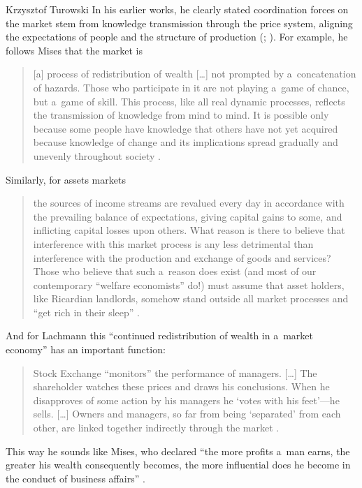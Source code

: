\begin{artengenv}{Krzysztof Turowski}
In his earlier works, he clearly stated coordination forces on the market stem from knowledge
transmission through the price system, aligning the expectations of people and the structure of production (\cite[103]{lachmann-ha}; \citeyear[62]{lachmann1956capital}).
For example, he follows Mises that the market is
\begin{quote}
[a] process of redistribution of wealth [\ldots] not prompted by a~concatenation of hazards. Those who participate in it are not playing a~game of chance, but a~game of skill. This process, like all real dynamic processes, reflects the transmission of knowledge from mind to mind. It is possible only because some people have knowledge that others have not yet acquired because knowledge of change and its implications spread gradually and unevenly throughout society \parencite[313]{lachmann-market-distribution}.
\end{quote}
Similarly, for assets markets
\begin{quote}
the sources of income streams are revalued every day in accordance with the prevailing balance of expectations, giving capital gains to some, and inflicting capital losses upon others. What reason is there to believe that interference with this market process is any less detrimental than interference with the production and exchange of goods and services? Those who believe that such a~reason does exist (and most of our contemporary ``welfare economists'' do!) must assume that asset holders, like Ricardian landlords, somehow stand outside all market processes and ``get rich in their sleep'' \parencite[163]{lachmann-model}.
\end{quote}
And for Lachmann this ``continued redistribution of wealth in a~market economy'' \parencite[202]{lachmann-hayek} has an important function:
\begin{quote}
Stock Exchange ``monitors'' the performance of managers. [\ldots] The shareholder watches these prices and draws his conclusions. When he disapproves of some action by his managers he `votes with his feet'---he sells. [\ldots] Owners and managers, so far from being `separated' from each other, are linked together indirectly through the market \parencite[249]{lachmann-legislation}.
\end{quote}
This way he sounds like Mises, who declared ``the more profits a~man earns, the greater his wealth consequently becomes, the more influential does he become in the conduct of business affairs'' \parencite[23]{mises-profit}.


\end{artengenv}
